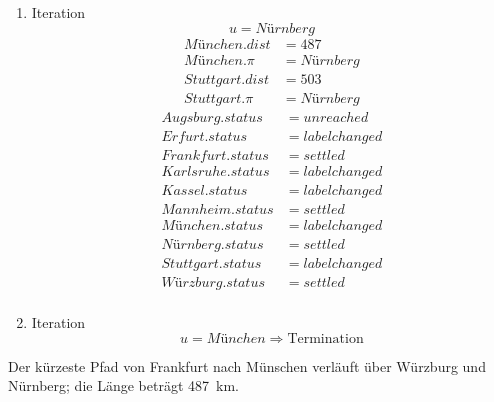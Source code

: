 \documentclass[a4paper]{scrartcl}
\begin{document}
\begin{enumerate}
    \item Iteration
        \begin{equation*}
            u = Nürnberg
        \end{equation*}
        \begin{align*}
            München.dist &= 487 \\
            München.\pi &= Nürnberg \\
            Stuttgart.dist &= 503 \\
            Stuttgart.\pi &= Nürnberg
        \end{align*}
        \begin{align*}
            Augsburg.status &= unreached \\
            Erfurt.status &= labelchanged \\
            Frankfurt.status &= settled \\
            Karlsruhe.status &= labelchanged \\
            Kassel.status &= labelchanged \\
            Mannheim.status &= settled \\
            München.status &= labelchanged \\
            Nürnberg.status &= settled \\
            Stuttgart.status &= labelchanged \\
            Würzburg.status &= settled \\
        \end{align*}
        
    \item Iteration
        \begin{equation*}
            u = München
            \Rightarrow
            \text{Termination}
        \end{equation*}

\end{enumerate}

Der kürzeste Pfad von Frankfurt nach Münschen verläuft über
Würzburg und Nürnberg; die Länge beträgt \SI{487}{\kilo\meter}.
\end{document}
